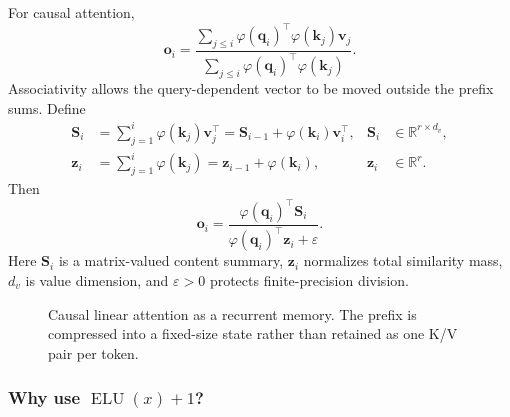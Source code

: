\documentclass[11pt,a4paper]{article}
\theoremstyle{definition}
\theoremstyle{plain}
\newcommand{\vq}{\bm{q}}
\newcommand{\vk}{\bm{k}}
\newcommand{\vv}{\bm{v}}
\newcommand{\vo}{\bm{o}}
\newcommand{\vz}{\bm{z}}
\newcommand{\mS}{\bm{S}}
\newcommand{\reals}{\mathbb{R}}
\DeclareMathOperator{\ELU}{ELU}
\begin{document}
For causal attention,
\begin{equation}\label{eq:linear-attn-sum}
    \vo_i=
    \frac{\sum_{j\leq i}\varphi(\vq_i)^\top\varphi(\vk_j)\vv_j}
         {\sum_{j\leq i}\varphi(\vq_i)^\top\varphi(\vk_j)}.
\end{equation}
Associativity allows the query-dependent vector to be moved outside the prefix sums. Define
\begin{align}
    \mS_i&=\sum_{j=1}^{i}\varphi(\vk_j)\vv_j^\top
          =\mS_{i-1}+\varphi(\vk_i)\vv_i^\top,
          &\mS_i&\in\reals^{r\times d_v},\\
    \vz_i&=\sum_{j=1}^{i}\varphi(\vk_j)
          =\vz_{i-1}+\varphi(\vk_i),
          &\vz_i&\in\reals^{r}.
\end{align}
Then
\begin{equation}\label{eq:linear-attn-recurrence}
    \vo_i=
    \frac{\varphi(\vq_i)^\top\mS_i}
         {\varphi(\vq_i)^\top\vz_i+\varepsilon}.
\end{equation}
Here $\mS_i$ is a matrix-valued content summary, $\vz_i$ normalizes total similarity mass, $d_v$ is value dimension, and $\varepsilon>0$ protects finite-precision division.

\begin{figure}[H]
\centering
{}
\caption{Causal linear attention as a recurrent memory. The prefix is compressed into a fixed-size state rather than retained as one K/V pair per token.}
\label{fig:linear-state}
\end{figure}

\subsubsection{Why use $\ELU(x)+1$?}
\end{document}
